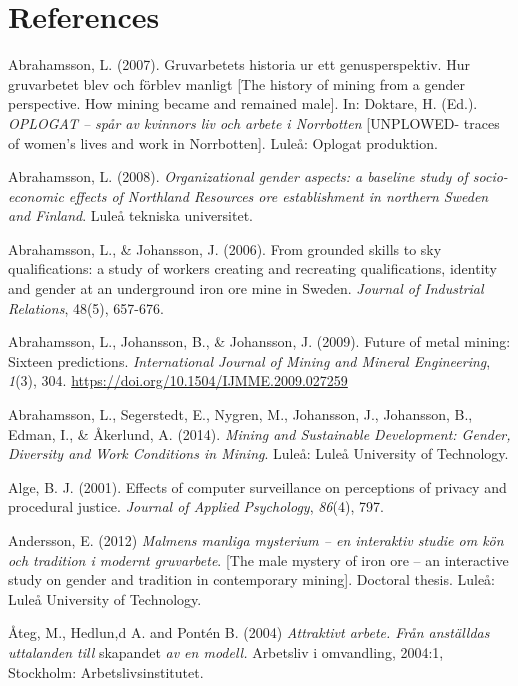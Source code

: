 \documentclass[
  12pt,
]{scrbook}
\begin{document}
\hypertarget{references}{%
\chapter*{References}\label{references}}

Abrahamsson, L. (2007). Gruvarbetets historia ur ett genusperspektiv.
Hur gruvarbetet blev och förblev manligt {[}The history of mining from a
gender perspective. How mining became and remained male{]}. In: Doktare,
H. (Ed.). \emph{OPLOGAT -- spår av kvinnors liv och arbete i Norrbotten}
{[}UNPLOWED- traces of women's lives and work in Norrbotten{]}. Luleå:
Oplogat produktion.

Abrahamsson, L. (2008). \emph{Organizational gender aspects: a baseline study
of socio-economic effects of Northland Resources ore establishment in
northern Sweden and Finland}. Luleå tekniska universitet.

Abrahamsson, L., \& Johansson, J. (2006). From grounded skills to sky
qualifications: a study of workers creating and recreating
qualifications, identity and gender at an underground iron ore mine in
Sweden. \emph{Journal of Industrial Relations}, 48(5), 657-676.

Abrahamsson, L., Johansson, B., \& Johansson, J. (2009). Future of metal
mining: Sixteen predictions. \emph{International Journal of Mining and
Mineral Engineering}, \emph{1}(3), 304.
\url{https://doi.org/10.1504/IJMME.2009.027259}

Abrahamsson, L., Segerstedt, E., Nygren, M., Johansson, J., Johansson,
B., Edman, I., \& Åkerlund, A. (2014). \emph{Mining and Sustainable
Development: Gender, Diversity and Work Conditions in Mining}. Luleå:
Luleå University of Technology.

Alge, B. J. (2001). Effects of computer surveillance on perceptions of
privacy and procedural justice. \emph{Journal of Applied Psychology},
\emph{86}(4), 797.

Andersson, E. (2012) \emph{Malmens manliga mysterium -- en interaktiv studie
om kön och tradition i modernt gruvarbete}. {[}The male mystery of iron
ore -- an interactive study on gender and tradition in contemporary
mining{]}. Doctoral thesis. Luleå: Luleå University of Technology.

Åteg, M., Hedlun,d A. and Pontén B. (2004) \emph{Attraktivt arbete. Från
anställdas uttalanden till} skapandet \emph{av en modell.} Arbetsliv i
omvandling, 2004:1, Stockholm: Arbetslivsinstitutet.
\end{document}
